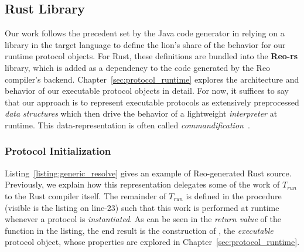 %


\subsection{Rust Library}
\label{sec:translation_phase_2}
Our work follows the precedent set by the Java code generator in relying on a library in the target language to define the lion's share of the behavior for our runtime protocol objects. For Rust, these definitions are bundled into the \textbf{Reo-rs} library, which is added as a dependency to the code generated by the Reo compiler's backend. Chapter~\ref{sec:protocol_runtime} explores the architecture and behavior of our executable protocol objects in detail. For now, it suffices to say that our approach is to represent executable protocols as extensively preprocessed \textit{data structures} which then drive the behavior of a lightweight \textit{interpreter} at runtime. This data-representation is often called \textit{commandification}~\cite{nystrom2014game}. 


\subsubsection{Protocol Initialization}
Listing~\ref{listing:generic_resolve} gives an example of Reo-generated Rust source. Previously, we explain how this representation delegates some of the work of $T_{run}$ to the Rust compiler itself. The remainder of $T_{run}$ is defined in the  procedure (visible is the listing on line-23) such that this work is performed at runtime whenever a protocol is \textit{instantiated}. As can be seen in the \textit{return value} of the function in the listing, the end result is the construction of , the \textit{executable} protocol object, whose properties are explored in Chapter~\ref{sec:protocol_runtime}.

